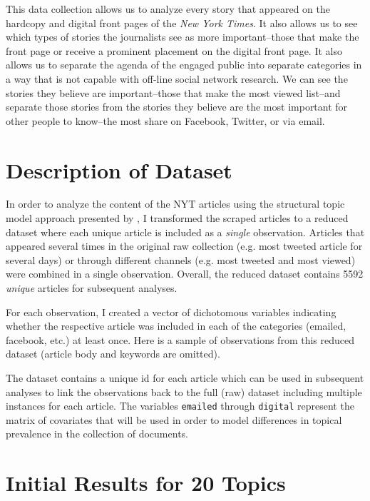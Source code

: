 \documentclass[12pt]{article}
\begin{document}
\begin{doublespace}
This data collection allows us to analyze every story that appeared on the hardcopy and digital front pages of the \textit{New York Times}. It also allows us to see which types of stories the journalists see as more important--those that make the front page or receive a prominent placement on the digital front page. It also allows us to separate the agenda of the engaged public into separate categories in a way that is not capable with off-line social network research. We can see the stories they believe are important--those that make the most viewed list--and separate those stories from the stories they believe are the most important for other people to know--the most share on Facebook, Twitter, or via email.


\section{Description of Dataset}

In order to analyze the content of the NYT articles using the structural topic model approach presented by \citet{roberts2014structural}, I transformed the scraped articles to a reduced dataset where each unique article is included as a \textit{single} observation. Articles that appeared several times in the original raw collection (e.g. most tweeted article for several days) or through different channels (e.g. most tweeted and most viewed) were combined in a single observation. Overall, the reduced dataset contains 5592 \textit{unique} articles for subsequent analyses.

For each observation, I created a vector of dichotomous variables indicating whether the respective article was included in each of the categories (emailed, facebook, etc.) at least once. Here is a sample of observations from this reduced dataset (article body and keywords are omitted).



The dataset contains a unique id for each article which can be used in subsequent analyses to link the observations back to the full (raw) dataset including multiple instances for each article. The variables \texttt{emailed} through \texttt{digital} represent the matrix of covariates that will be used in order to model differences in topical prevalence in the collection of documents.


\section{Initial Results for 20 Topics}


\end{doublespace}
\end{document}
